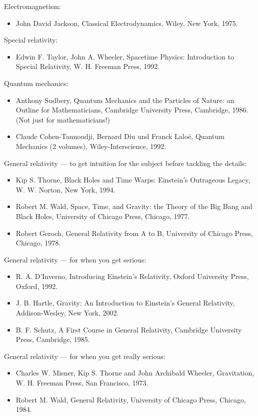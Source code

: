 \documentclass[10pt,a4paper]{book}
\theoremstyle{definition}
\begin{document}
Electromagnetism:
\begin{itemize}
\item John David Jackson, Classical Electrodynamics, Wiley, New York, 1975.
\end{itemize}

Special relativity:
\begin{itemize}
\item Edwin F. Taylor, John A. Wheeler, Spacetime Physics: Introduction to Special Relativity, W. H. Freeman Press, 1992.
\end{itemize}

Quantum mechanics:
\begin{itemize}
\item Anthony Sudbery, Quantum Mechanics and the Particles of Nature: an Outline for Mathematicians, Cambridge University Press, Cambridge, 1986. (Not just for mathematicians!)

\item Claude Cohen-Tannoudji, Bernard Diu und Franck Laloë, Quantum Mechanics (2 volumes), Wiley-Interscience, 1992. 
\end{itemize}


General relativity — to get intuition for the subject before tackling the details:
\begin{itemize}
\item  Kip S. Thorne, Black Holes and Time Warps: Einstein's Outrageous Legacy, W. W. Norton, New York, 1994.
\item Robert M. Wald, Space, Time, and Gravity: the Theory of the Big Bang and Black Holes, University of Chicago Press, Chicago, 1977.
\item Robert Geroch, General Relativity from A to B, University of Chicago Press, Chicago, 1978.
\end{itemize}

General relativity — for when you get serious:
\begin{itemize}
\item  R. A. D'Inverno, Introducing Einstein's Relativity, Oxford University Press, Oxford, 1992.
\item J. B. Hartle, Gravity: An Introduction to Einstein's General Relativity, Addison-Wesley, New York, 2002.
\item B. F. Schutz, A First Course in General Relativity, Cambridge University Press, Cambridge, 1985.
\end{itemize}

General relativity — for when you get really serious:
\begin{itemize}
\item Charles W. Misner, Kip S. Thorne and John Archibald Wheeler, Gravitation, W. H. Freeman Press, San Francisco, 1973.
\item Robert M. Wald, General Relativity, University of Chicago Press, Chicago, 1984.
\end{itemize}
\end{document}
